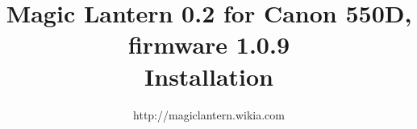 \documentclass{article}
\begin{document}
\title{Magic Lantern 0.2 for Canon 550D, firmware 1.0.9\\Installation}
\author{http://magiclantern.wikia.com}
\maketitle
\vspace{-10mm}
{
\renewcommand{\baselinestretch}{0.9}
\tableofcontents
}
\newpage

\end{document}
